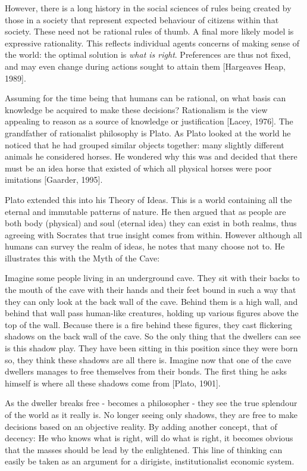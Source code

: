 However, there is a long history in the social sciences of rules being created by those in a society that represent expected behaviour of citizens within that society. These need not be rational rules of thumb. A final more likely model is expressive rationality. This reflects individual agents concerns of making sense of the world: the optimal solution is \textit{what is right}. Preferences are thus not fixed, and may even change during actions sought to attain them [Hargeaves Heap, 1989].

Assuming for the time being that humans can be rational, on what basis can knowledge be acquired to make these decisions? Rationalism is the view appealing to reason as a source of knowledge or justification [Lacey, 1976]. The grandfather of rationalist philosophy is Plato. As Plato looked at the world he noticed that he had grouped similar objects together: many slightly different animals he considered horses. He wondered why this was and decided that there must be an idea horse that existed of which all physical horses were poor imitations [Gaarder, 1995].

Plato extended this into his Theory of Ideas. This is a world containing all the eternal and immutable patterns of nature. He then argued that as people are both body (physical) and soul (eternal idea) they can exist in both realms, thus agreeing with Socrates that true insight comes from within. However although all humans can survey the realm of ideas, he notes that many choose not to. He illustrates this with the Myth of the Cave:

\begin{displayquote}
Imagine some people living in an underground cave. They sit with their backs to the mouth of the cave with their hands and their feet bound in such a way that they can only look at the back wall of the cave. Behind them is a high wall, and behind that wall pass human-like creatures, holding up various figures above the top of the wall. Because there is a fire behind these figures, they cast flickering shadows on the back wall of the cave. So the only thing that the dwellers can see is this shadow play. They have been sitting in this position since they were born so, they think these shadows are all there is. Imagine now that one of the cave dwellers manages to free themselves from their bonds. The first thing he asks himself is where all these shadows come from [Plato, 1901].
\end{displayquote}

As the dweller breaks free - becomes a philosopher - they see the true splendour of the world as it really is. No longer seeing only shadows, they are free to make decisions based on an objective reality. By adding another concept, that of decency: He who knows what is right, will do what is right, it becomes obvious that the masses should be lead by the enlightened. This line of thinking can easily be taken as an argument for a dirigiste, institutionalist economic system.

